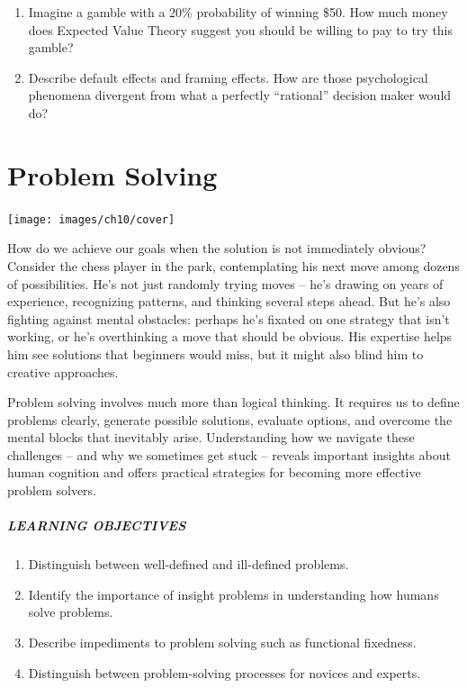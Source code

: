 \documentclass[
]{krantz}
\providecommand{\tightlist}{%
  \setlength{\itemsep}{0pt}\setlength{\parskip}{0pt}}
\begin{document}
\begin{enumerate}
\def\labelenumi{\arabic{enumi}.}
\tightlist
\item
  Imagine a gamble with a 20\% probability of winning \$50. How much money does Expected Value Theory suggest you should be willing to pay to try this gamble?
\item
  Describe default effects and framing effects. How are those psychological phenomena divergent from what a perfectly ``rational'' decision maker would do?
\end{enumerate}

\chapter{Problem Solving}\label{problem-solving}

\begin{center}\texttt{[image: images/ch10/cover]} \end{center}

How do we achieve our goals when the solution is not immediately obvious? Consider the chess player in the park, contemplating his next move among dozens of possibilities. He's not just randomly trying moves -- he's drawing on years of experience, recognizing patterns, and thinking several steps ahead. But he's also fighting against mental obstacles: perhaps he's fixated on one strategy that isn't working, or he's overthinking a move that should be obvious. His expertise helps him see solutions that beginners would miss, but it might also blind him to creative approaches.

Problem solving involves much more than logical thinking. It requires us to define problems clearly, generate possible solutions, evaluate options, and overcome the mental blocks that inevitably arise. Understanding how we navigate these challenges -- and why we sometimes get stuck -- reveals important insights about human cognition and offers practical strategies for becoming more effective problem solvers.

\paragraph*{LEARNING OBJECTIVES}\label{learning-objectives-9}

\begin{enumerate}
\def\labelenumi{\arabic{enumi}.}
\tightlist
\item
  Distinguish between well-defined and ill-defined problems.
\item
  Identify the importance of insight problems in understanding how humans solve problems.
\item
  Describe impediments to problem solving such as functional fixedness.
\item
  Distinguish between problem-solving processes for novices and experts.
\end{enumerate}
\end{document}
